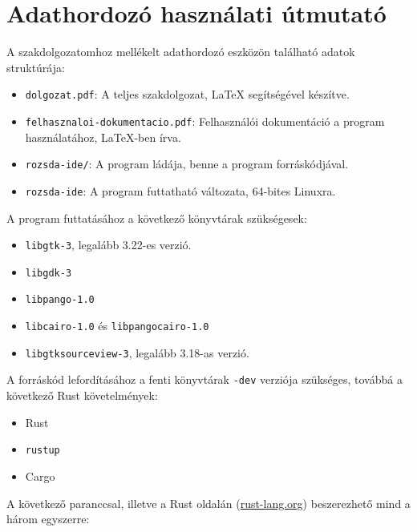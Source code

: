 \chapter*{Adathordozó használati útmutató}



\noindent A szakdolgozatomhoz mellékelt adathordozó eszközön található adatok struktúrája:

\begin{itemize}
    \item \texttt{dolgozat.pdf}: A teljes szakdolgozat, \LaTeX{} segítségével készítve.
    \item \texttt{felhasznaloi-dokumentacio.pdf}: Felhasználói dokumentáció a program használatához, \LaTeX{}-ben írva.
    \item \texttt{rozsda-ide/}: A program ládája, benne a program forráskódjával.
    \item \texttt{rozsda-ide}: A program futtatható változata, 64-bites Linuxra.
\end{itemize}

\noindent A program futtatásához a következő könyvtárak szükségesek:

\begin{itemize}
    \item \texttt{libgtk-3}, legalább 3.22-es verzió.
    \item \texttt{libgdk-3}
    \item \texttt{libpango-1.0}
    \item \texttt{libcairo-1.0} és \texttt{libpangocairo-1.0}
    \item \texttt{libgtksourceview-3}, legalább 3.18-as verzió.
\end{itemize}

\noindent A forráskód lefordításához a fenti könyvtárak \texttt{-dev} verziója szükséges,
továbbá a következő Rust követelmények:

\begin{itemize}
    \item Rust
    \item \texttt{rustup}
    \item Cargo
\end{itemize}

\noindent A következő paranccsal, illetve a Rust oldalán (\url{rust-lang.org})
beszerezhető mind a három egyszerre: 